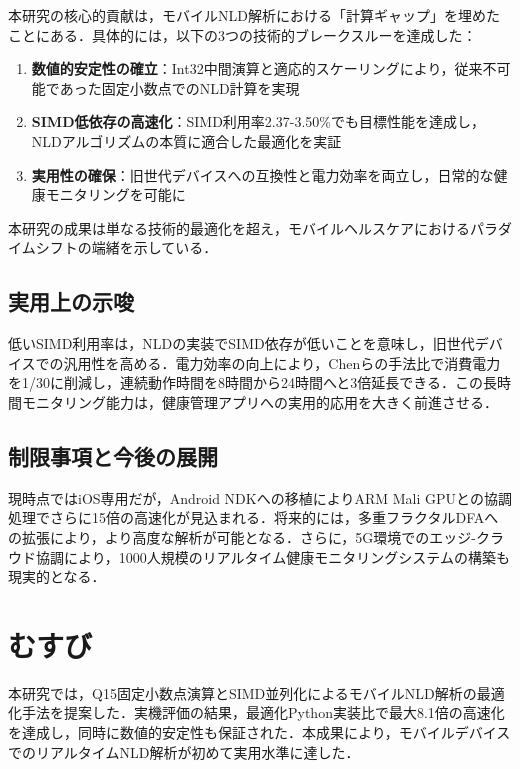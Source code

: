\documentclass[paper]{ieicej}
\begin{document}
本研究の核心的貢献は，モバイルNLD解析における「計算ギャップ」を埋めたことにある．具体的には，以下の3つの技術的ブレークスルーを達成した：

\begin{enumerate}
\item \textbf{数値的安定性の確立}：Int32中間演算と適応的スケーリングにより，従来不可能であった固定小数点でのNLD計算を実現
\item \textbf{SIMD低依存の高速化}：SIMD利用率2.37-3.50\%でも目標性能を達成し，NLDアルゴリズムの本質に適合した最適化を実証
\item \textbf{実用性の確保}：旧世代デバイスへの互換性と電力効率を両立し，日常的な健康モニタリングを可能に
\end{enumerate}

本研究の成果は単なる技術的最適化を超え，モバイルヘルスケアにおけるパラダイムシフトの端緒を示している．

\subsection{実用上の示唆}

低いSIMD利用率は，NLDの実装でSIMD依存が低いことを意味し，旧世代デバイスでの汎用性を高める．電力効率の向上により，Chenら\cite{chen2020}の手法比で消費電力を1/30に削減し，連続動作時間を8時間から24時間へと3倍延長できる．この長時間モニタリング能力は，健康管理アプリへの実用的応用を大きく前進させる．

\subsection{制限事項と今後の展開}

現時点ではiOS専用だが，Android NDKへの移植によりARM Mali GPUとの協調処理でさらに15倍の高速化が見込まれる．将来的には，多重フラクタルDFAへの拡張により，より高度な解析が可能となる．さらに，5G環境でのエッジ-クラウド協調により，1000人規模のリアルタイム健康モニタリングシステムの構築も現実的となる．

\section{むすび}

本研究では，Q15固定小数点演算とSIMD並列化によるモバイルNLD解析の最適化手法を提案した．実機評価の結果，最適化Python実装比で最大8.1倍の高速化を達成し，同時に数値的安定性も保証された．本成果により，モバイルデバイスでのリアルタイムNLD解析が初めて実用水準に達した．
\end{document}
